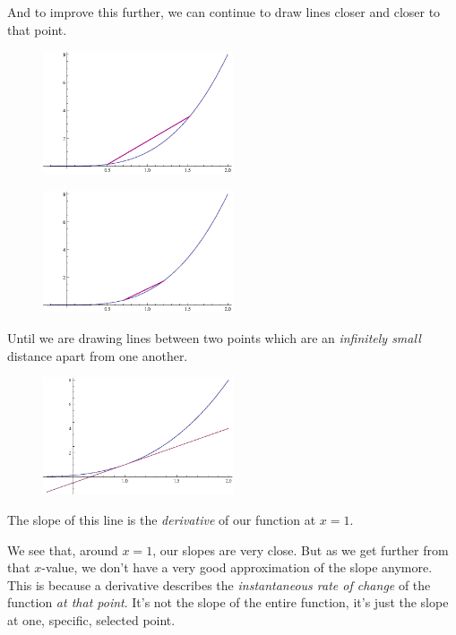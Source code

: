 And to improve this further, we can continue to draw lines closer and closer to that point.
\begin{figure}[H]
  \begin{center}
    \includegraphics[width=0.5\textwidth]{continuous/derivatives/x3_3.eps}
  \end{center}
\end{figure}
\begin{figure}[H]
  \begin{center}
    \includegraphics[width=0.5\textwidth]{continuous/derivatives/x3_4.eps}
  \end{center}
\end{figure}
Until we are drawing lines between two points which are an \emph{infinitely small} distance apart from one another.
\begin{figure}[H]
  \begin{center}
    \includegraphics[width=0.5\textwidth]{continuous/derivatives/x3vline.eps}
  \end{center}
\end{figure}
The slope of this line is the \emph{derivative} of our function at $x=1$.

We see that, around $x=1$, our slopes are very close.
But as we get further from that $x$-value, we don't have a very good approximation of the slope anymore.
This is because a derivative describes the \emph{instantaneous rate of change} of the function \emph{at that point}.
It's not the slope of the entire function, it's just the slope at one, specific, selected point.

